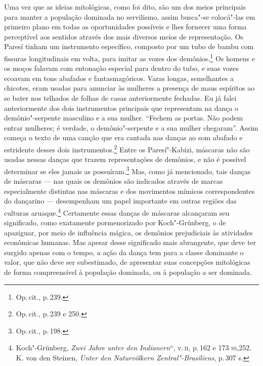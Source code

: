 Uma vez que as ideias mitológicas, como foi dito, são um dos meios
principais para manter a população dominada no servilismo, assim
busca"-se colocá"-las em primeiro plano em todas as oportunidades
possíveis e lhes fornecer uma forma perceptível aos sentidos através dos
mais diversos meios de representação. Os Paresí tinham um instrumento
específico, composto por um tubo de bambu com fissuras longitudinais em
volta, para imitar as vozes dos demônios.\footnote{Op.\,cit., p.\,239.} Os
homens e os moços falavam com entonação especial para dentro do tubo, e
suas vozes ecoavam em tons abafados e fantasmagóricos. Varas longas,
semelhantes a chicotes, eram usadas para anunciar às mulheres a presença
de maus espíritos ao se bater nos telhados de folhas de casas
anteriormente fechadas. Eu já falei anteriormente dos dois instrumentos
principais que representam na dança o demônio"-serpente masculino e a sua
mulher. ``Fechem as portas. Não podem entrar mulheres; é verdade, o
demônio"-serpente e a sua mulher chegaram''. Assim começa o texto de uma
canção que era cantada nas danças ao som abafado e estridente desses
dois instrumentos.\footnote{Op.\,cit., p.\,239 e 250.} Entre os
Paresí"-Kabizi, máscaras não são usadas nessas danças que trazem
representações de demônios, e não é possível determinar se eles jamais
as possuíram.\footnote{Op.\,cit., p.\,198.} Mas, como já mencionado, tais
danças de máscaras --- nas quais os demônios são indicados através de
marcas especialmente distintas nas máscaras e dos movimentos mímicos
correspondentes do dançarino --- desempenham um papel importante em
outras regiões das culturas aruaque.\footnote{Koch"-Grünberg, \textit{Zwei
  Jahre unter den Indianern}``, v.\,\textsc{ii}, p.\,162 e 173 \textsc{ss},252. K. von den
  Steinen, \textit{Unter den Naturvölkern Zentral"-Brasiliens}, p.\,307 s.}
Certamente essas danças de máscaras alcançaram seu significado, como
exatamente pormenorizado por Koch"-Grünberg, o de apaziguar, por meio de
influência mágica, os demônios prejudiciais às atividades econômicas
humanas. Mas apesar desse significado mais abrangente, que deve ter
surgido apenas com o tempo, a ação da dança tem para a classe dominante
o valor, que não deve ser subestimado, de apresentar suas concepções
mitológicas de forma compreensível à população dominada, ou à
população a ser dominada.

